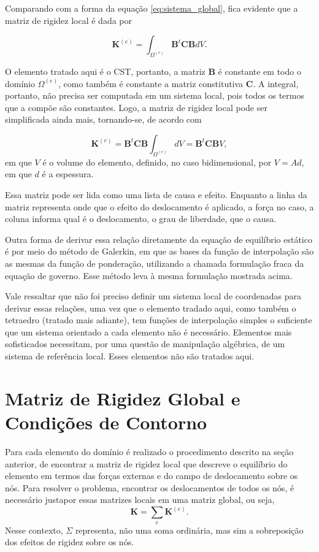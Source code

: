 Comparando com a forma da equação \ref{eq:sistema_global}, fica evidente que a matriz de rigidez local é dada por

\begin{equation}
    \bm{K}^{(e)} = \int_{\Omega^{(e)}} \bm{B}^t \bm{C} \bm{B} dV.
\end{equation}

O elemento tratado aqui é o CST, portanto, a matriz $\bm{B}$ é constante em todo o domínio $\Omega^{(e)}$, como também é constante a matriz constitutiva $\bm{C}$. A integral, portanto, não precisa ser computada em um sistema local, pois todos os termos que a compõe são constantes. Logo, a matriz de rigidez local pode ser simplificada ainda mais, tornando-se, de acordo com 

\begin{equation}
    \bm{K}^{(e)} = \bm{B}^t \bm{C} \bm{B} \int_{\Omega^{(e)}} dV = \bm{B}^t \bm{C} \bm{B} V,
    \label{eq:matriz_local}
\end{equation}
em que $V$ é o volume do elemento, definido, no caso bidimensional, por $V = A d$, em que $d$ é a espessura.

Essa matriz pode ser lida como uma lista de causa e efeito. Enquanto a linha da matriz representa onde que o efeito do deslocamento é aplicado, a força no caso, a coluna informa qual é o deslocamento, o grau de liberdade, que o causa. \cite{LOGAN}

Outra forma de derivar essa relação diretamente da equação de equilíbrio estático é por meio do método de Galerkin, em que as bases da função de interpolação são as mesmas da função de ponderação, utilizando a chamada formulação fraca da equação de governo. Esse método leva à mesma formulação mostrada acima.

Vale ressaltar que não foi preciso definir um sistema local de coordenadas para derivar essas relações, uma vez que o elemento tradado aqui, como também o tetraedro (tratado mais adiante), tem funções de interpolação simples o suficiente que um sistema orientado a cada elemento não é necessário. Elementos mais sofisticados necessitam, por uma questão de manipulação algébrica, de um sistema de referência local. Esses elementos não são tratados aqui.

\section{Matriz de Rigidez Global e Condições de Contorno}

Para cada elemento do domínio é realizado o procedimento descrito na seção anterior, de encontrar a matriz de rigidez local que descreve o equilíbrio do elemento em termos das forças externas e do campo de deslocamento sobre os nós. Para resolver o problema, encontrar os deslocamentos de todos os nós, é necessário justapor essas matrizes locais em uma matriz global, ou seja,
\begin{equation}
    \bm{K} = \sum_{e} \bm{K}^{(e)}.
\end{equation}
Nesse contexto, $\Sigma$ representa, não uma soma ordinária, mas sim a sobreposição dos efeitos de rigidez sobre os nós. \cite{LOGAN}

